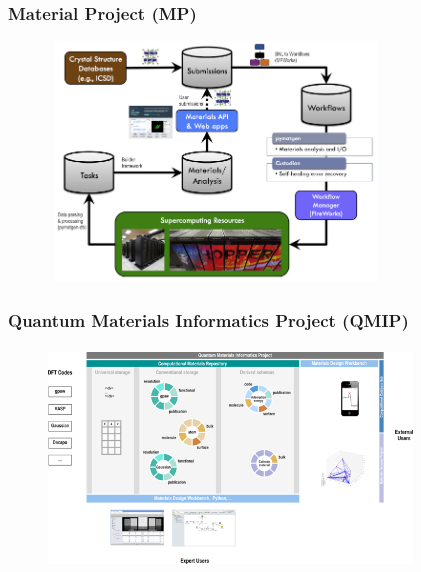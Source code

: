 \documentclass[cjk,slidestop,compress,mathserif,blue]{beamer}
\begin{document}
\frame
{
	\frametitle{\textrm{Material Project (MP)}}
\begin{figure}[h!]
\centering
\vspace*{-0.2in}
\includegraphics[height=2.5in,width=3.5in,viewport=0 0 670 530,clip]{Figures/MP_comp_infrastructure.png}
\caption{\fontsize{7.2pt}{4.2pt}}%
\label{MP_commp_infrastructure}
\end{figure} 
}

\frame
{
	\frametitle{\textrm{Quantum Materials Informatics Project (QMIP)}}
\begin{figure}[h!]
\centering
\vspace*{-0.2in}
\includegraphics[height=2.3in,width=3.8in,viewport=0 0 670 420,clip]{Figures/QMIP_shame.png}
\caption{\fontsize{7.2pt}{4.2pt}}%
\label{QMIP_Shame}
\end{figure} 
}
\end{document}
